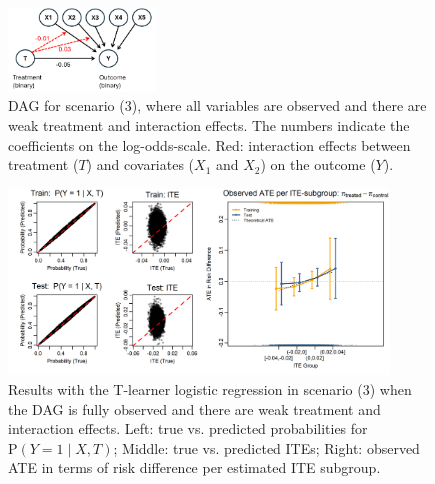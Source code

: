 \begin{figure}[htbp]
\centering
\includegraphics[width=0.35\textwidth]{img/results_ITE_simulation/simulation_small_effects.png}
\caption{DAG for scenario (3), where all variables are observed and there are weak treatment and interaction effects. The numbers indicate the coefficients on the log-odds-scale. Red: interaction effects between treatment ($T$) and covariates ($X_1$ and $X_2$) on the outcome ($Y$).}
\label{fig:small_interaction_dag}
\end{figure}




\begin{figure}[htbp]
\centering
\includegraphics[width=0.9\textwidth]{img/results_ITE_simulation/small_interaction_glm_tlearner.png}
\caption{Results with the T-learner logistic regression in scenario (3) when the DAG is fully observed and there are weak treatment and interaction effects. Left: true vs. predicted probabilities for $\text{P}(Y=1 \mid X, T)$; Middle: true vs. predicted ITEs; Right: observed ATE in terms of risk difference per estimated ITE subgroup.}
\label{fig:small_interaction_glm_tlearner}
\end{figure}




